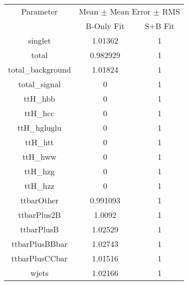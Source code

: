 \begin{table}
\centering

\begin{tabular}{ccc}
\toprule
Parameter & \multicolumn{2}{c}{Mean $\pm$ Mean Error $\pm$ RMS}\\
 & B-Only Fit & S+B Fit\\
\midrule
singlet & \num{1.01362} & \num{1}\\
total & \num{0.982929} & \num{1}\\
total\_background & \num{1.01824} & \num{1}\\
total\_signal & \num{0} & \num{1}\\
ttH\_hbb & \num{0} & \num{1}\\
ttH\_hcc & \num{0} & \num{1}\\
ttH\_hgluglu & \num{0} & \num{1}\\
ttH\_htt & \num{0} & \num{1}\\
ttH\_hww & \num{0} & \num{1}\\
ttH\_hzg & \num{0} & \num{1}\\
ttH\_hzz & \num{0} & \num{1}\\
ttbarOther & \num{0.991093} & \num{1}\\
ttbarPlus2B & \num{1.0092} & \num{1}\\
ttbarPlusB & \num{1.02529} & \num{1}\\
ttbarPlusBBbar & \num{1.02743} & \num{1}\\
ttbarPlusCCbar & \num{1.01516} & \num{1}\\
wjets & \num{1.02166} & \num{1}\\
\bottomrule
\end{tabular}
\end{table}